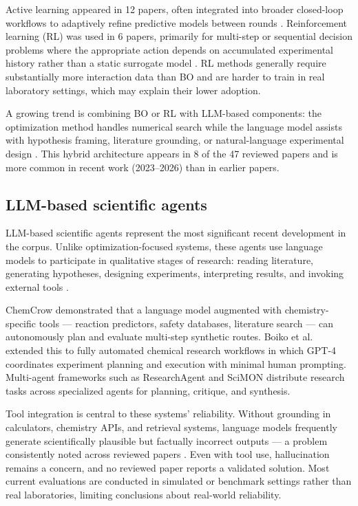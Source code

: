 \documentclass{article}
\begin{document}
Active learning appeared in 12 papers, often integrated into broader closed-loop workflows to adaptively refine predictive models between rounds \cite{lookman2019active, reker2015active}. Reinforcement learning (RL) was used in 6 papers, primarily for multi-step or sequential decision problems where the appropriate action depends on accumulated experimental history rather than a static surrogate model \cite{degrave2022magnetic}. RL methods generally require substantially more interaction data than BO and are harder to train in real laboratory settings, which may explain their lower adoption.

A growing trend is combining BO or RL with LLM-based components: the optimization method handles numerical search while the language model assists with hypothesis framing, literature grounding, or natural-language experimental design \cite{bran2023chemcrow, boiko2023autonomous}. This hybrid architecture appears in 8 of the 47 reviewed papers and is more common in recent work (2023–2026) than in earlier papers.

\subsection{LLM-based scientific agents}

LLM-based scientific agents represent the most significant recent development in the corpus. Unlike optimization-focused systems, these agents use language models to participate in qualitative stages of research: reading literature, generating hypotheses, designing experiments, interpreting results, and invoking external tools \cite{bran2023chemcrow, boiko2023autonomous, baek2024researchagent}.

ChemCrow \cite{bran2023chemcrow} demonstrated that a language model augmented with chemistry-specific tools — reaction predictors, safety databases, literature search — can autonomously plan and evaluate multi-step synthetic routes. Boiko et al.\ \cite{boiko2023autonomous} extended this to fully automated chemical research workflows in which GPT-4 coordinates experiment planning and execution with minimal human prompting. Multi-agent frameworks such as ResearchAgent \cite{baek2024researchagent} and SciMON \cite{wang2023scimon} distribute research tasks across specialized agents for planning, critique, and synthesis.

Tool integration is central to these systems' reliability. Without grounding in calculators, chemistry APIs, and retrieval systems, language models frequently generate scientifically plausible but factually incorrect outputs — a problem consistently noted across reviewed papers \cite{bran2023chemcrow, boiko2023autonomous, he2024moscibench}. Even with tool use, hallucination remains a concern, and no reviewed paper reports a validated solution. Most current evaluations are conducted in simulated or benchmark settings rather than real laboratories, limiting conclusions about real-world reliability.
\end{document}
